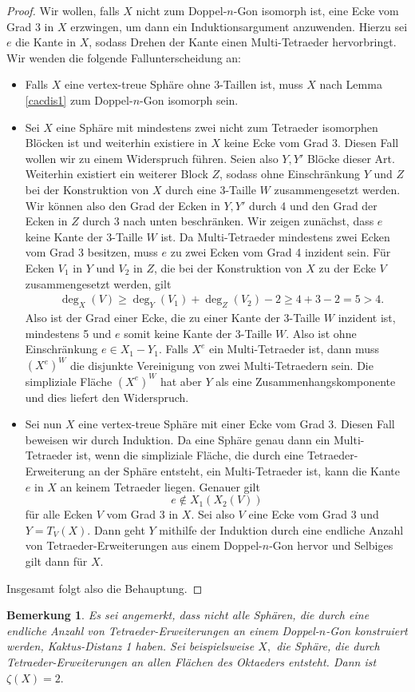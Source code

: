 \documentclass[12pt,titlepage,twoside,cleardoublepage]{article}
\theoremstyle{nummermitklammern}
\newtheorem{bemerkung}[temp]{Bemerkung}
\newtheorem{bemerkung}[zahl]{Bemerkung}
\numberwithin{equation}{section}
\begin{document}
\begin{proof}
Wir wollen, falls $X$ nicht zum Doppel-$n$-Gon isomorph ist, eine Ecke vom Grad 3 in $X$ erzwingen, um dann ein Induktionsargument anzuwenden. Hierzu sei $e$ die Kante in $X$, sodass Drehen der Kante einen Multi-Tetraeder hervorbringt. Wir wenden die folgende Fallunterscheidung an:
\begin{itemize}
\item Falls $X$ eine vertex-treue Sphäre ohne 3-Taillen ist, muss $X$ nach Lemma \ref{cacdis1} zum Doppel-$n$-Gon isomorph sein.
\item Sei $X$ eine Sphäre mit mindestens zwei nicht zum Tetraeder isomorphen Blöcken ist und weiterhin existiere in $X$ keine Ecke vom Grad 3. Diesen Fall wollen wir zu einem Widerspruch führen. Seien also $Y,Y'$  Blöcke dieser Art. Weiterhin existiert ein weiterer Block $Z$, sodass ohne Einschränkung $Y$ und $Z$ bei der Konstruktion von $X$ durch eine 3-Taille $W$ zusammengesetzt werden. Wir können also den Grad der Ecken in $Y,Y'$ durch 4 und den Grad der Ecken in $Z$ durch 3 nach unten beschränken. Wir zeigen zunächst, dass $e$ keine Kante der 3-Taille $W$ ist. Da Multi-Tetraeder mindestens zwei Ecken vom Grad 3 besitzen, muss $e$ zu zwei Ecken vom Grad 4 inzident sein.
 Für Ecken $V_1$ in $Y$ und $V_2$ in $Z$, die bei der Konstruktion von $X$ zu der Ecke $V$ zusammengesetzt werden, gilt 
\begin{align*}
&\deg_X(V)\geq \deg_{Y}(V_1)+ \deg_{Z}(V_2)-2\geq 4+3-2=5>4.
\end{align*}
Also ist der Grad einer Ecke, die zu einer Kante der 3-Taille $W$ inzident ist, mindestens 5 und $e$ somit keine Kante der 3-Taille $W$. Also ist ohne Einschränkung $e\in X_1- Y_1.$
Falls $X^e$ ein Multi-Tetraeder ist, dann muss ${(X^e)}^W$ die disjunkte Vereinigung von zwei Multi-Tetraedern sein. Die simpliziale Fläche ${(X^e)}^W$ hat aber $Y$ als eine Zusammenhangskomponente und dies liefert den Widerspruch.
\item Sei nun $X$ eine vertex-treue Sphäre mit einer Ecke vom Grad 3. Diesen Fall beweisen wir durch Induktion. Da eine Sphäre genau dann ein Multi-Tetraeder ist, wenn die simpliziale Fläche, die durch eine Tetraeder-Erweiterung an der Sphäre entsteht, ein Multi-Tetraeder ist, kann die Kante $e$ in $X$ an keinem Tetraeder liegen. Genauer gilt 
\[
e\notin X_1(X_2(V))
\]
für alle Ecken $V$ vom Grad 3 in $X.$ Sei also $V$ eine Ecke vom Grad 3 und $Y=T_V(X).$ Dann geht $Y$ mithilfe der Induktion durch eine endliche Anzahl von Tetraeder-Erweiterungen aus einem Doppel-$n$-Gon hervor und Selbiges gilt dann für $X.$
\end{itemize}
Insgesamt folgt also die Behauptung.
\end{proof}
\begin{bemerkung}
Es sei angemerkt, dass nicht alle Sphären, die durch eine endliche Anzahl von Tetraeder-Erweiterungen an einem Doppel-$n$-Gon konstruiert werden, Kaktus-Distanz 1 haben. Sei beispielsweise $X,$ die Sphäre, die durch Tetraeder-Erweiterungen an allen Flächen des Oktaeders entsteht. Dann ist $\zeta(X)=2.$ 
\end{bemerkung}
\end{document}
